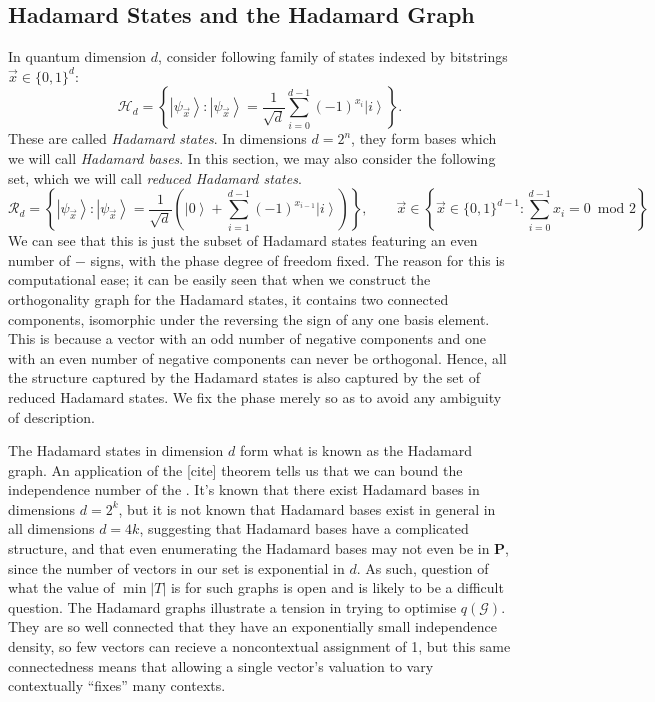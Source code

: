 \documentclass{amsart}
\theoremstyle{definition}
\newcommand{\ket}[1]{{\left\vert{#1}\right\rangle}}
\begin{document}
\subsection{Hadamard States and the Hadamard Graph}

In quantum dimension $d$, consider following family of states indexed by bitstrings $\vec{x}\in\{0,1\}^d$:
\begin{equation}
\mathcal{H}_d=\left\{ \ket{\psi_{\vec{x}}}:\ket{\psi_{\vec{x}}} = \frac{1}{\sqrt{d}}\sum_{i=0}^{d-1}(-1)^{x_i}\ket{i}  \right\}.
\end{equation}
These are called \emph{Hadamard states}. In dimensions $d=2^n$, they form bases which we will call \emph{Hadamard bases}. In this section, we may also consider the following set, which we will call \emph{reduced Hadamard states}.
\begin{equation}
\mathcal{R}_d=\left\{ \ket{\psi_{\vec{x}}}:\ket{\psi_{\vec{x}}} = \frac{1}{\sqrt{d}}\left(\ket{0}+\sum_{i=1}^{d-1}(-1)^{x_{i-1}}\ket{i}  \right)\right\}, \qquad\vec{x}\in\left\{\vec{x}\in\{0,1\}^{d-1}:\sum_{i=0}^{d-1} x_i =0 \enspace \mbox{mod 2}\right\}
\end{equation}
We can see that this is just the subset of Hadamard states featuring an even number of $-$ signs, with the phase degree of freedom fixed. The reason for this is computational ease; it can be easily seen that when we construct the orthogonality graph for the Hadamard states, it contains two connected components, isomorphic under the reversing the sign of any one basis element. This is because a vector with an odd number of negative components and one with an even number of negative components can never be orthogonal. Hence, all the structure captured by the Hadamard states is also captured by the set of reduced Hadamard states. We fix the phase merely so as to avoid any ambiguity of description.

The Hadamard states in dimension $d$ form what is known as the Hadamard graph. An application of the [cite] theorem tells us that we can bound the independence number of the . It's known that there exist Hadamard bases in dimensions $d=2^k$, but it is not known that Hadamard bases exist in general in all dimensions $d=4k$, suggesting that Hadamard bases have a complicated structure, and that even enumerating the Hadamard bases may not even be in \textbf{P}, since the number of vectors in our set is exponential in $d$. As such, question of what the value of $\min|T|$  is for such graphs is open and is likely to be a difficult question. The Hadamard graphs illustrate a tension in trying to optimise $q(\mathcal{G})$. They are so well connected that they have an exponentially small independence density, so few vectors can recieve a noncontextual assignment of 1, but this same connectedness means that allowing a single vector's valuation to vary contextually ``fixes'' many contexts.
\end{document}
